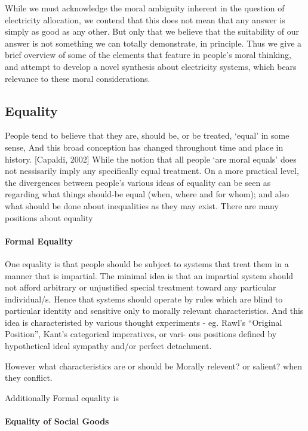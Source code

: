 \documentclass[
10pt, %
a4paper, %
oneside, %
headinclude,footinclude, %
BCOR5mm, %
]{scrartcl}
\begin{document}
While we must acknowledge the moral ambiguity inherent in the question of electricity allocation, we contend that this does not mean that any answer is simply as good as any other.
But only that we believe that the suitability of our answer is not something we can totally demonstrate, in principle.
Thus we give a brief overview of some of the elements that feature in people's moral thinking, and attempt to develop a novel synthesis about electricity systems, which bears relevance to these moral considerations.

\subsection{Equality}

People tend to believe that they are, should be, or be treated, ‘equal’ in some sense, And this broad conception has changed throughout time and place in history. [Capaldi, 2002]
While the notion that all people `are moral equals' does not nessisarily imply any specifically equal treatment. On a more practical level, the divergences between people's various ideas of equality can be seen as regarding what things should-be equal (when, where and for whom); and also what should be done about inequalities as they may exist.
There are many positions about equality

\paragraph{Formal Equality}

One equality is that people should be subject to systems that treat them in a manner that is impartial. The minimal idea is that an impartial system should not afford arbitrary or unjustified special treatment toward any particular individual/s. Hence that systems should operate by rules which are blind to particular identity and sensitive only to morally relevant characteristics.
And this idea is characteristed by various thought experiments - eg. Rawl’s “Original Position”, Kant’s categorical imperatives, or vari-
ous positions defined by hypothetical ideal sympathy and/or perfect detachment.

However what characteristics are or should be Morally relevent? or salient? when they conflict.

Additionally Formal equality is 

\paragraph{Equality of Social Goods}
\end{document}
